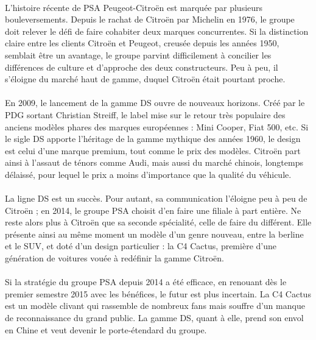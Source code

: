 \documentclass[12pt]{article}\usepackage[]{graphicx}\usepackage[]{color}
\begin{document}
\paragraph{} L'histoire récente de PSA Peugeot-Citroën est marquée par
plusieurs bouleversements. Depuis le rachat de Citroën par Michelin en 1976, le
groupe doit relever le défi de faire cohabiter deux marques concurrentes. Si la
distinction claire entre les clients Citroën et Peugeot, creusée depuis les
années 1950, semblait être un avantage, le groupe parvint difficilement à
concilier les différences de culture et d'approche des deux constructeurs. Peu
à peu, il s'éloigne du marché haut de gamme, duquel Citroën était pourtant
proche.

\paragraph{} En 2009, le lancement de la gamme DS ouvre de nouveaux horizons.
Créé par le PDG sortant Christian Streiff, le label mise sur le retour très
populaire des anciens modèles phares des marques européennes : Mini Cooper,
Fiat 500, etc. Si le sigle DS apporte l'héritage de la gamme mythique des
années 1960, le design est celui d'une marque premium, tout comme le prix des
modèles. Citroën part ainsi à l'assaut de ténors comme Audi, mais aussi du
marché chinois, longtemps délaissé, pour lequel le prix a moins d'importance
que la qualité du véhicule.

\paragraph{} La ligne DS est un succès. Pour autant, sa communication l'éloigne
peu à peu de Citroën ; en 2014, le groupe PSA choisit d'en faire une filiale à part
entière. Ne reste alors plus à Citroën que sa seconde spécialité, celle de
faire du différent. Elle présente ainsi au même moment un modèle d'un genre
nouveau, entre la berline et le SUV, et doté d'un design particulier : la C4
Cactus, première d'une génération de voitures vouée à redéfinir la gamme
Citroën.

\paragraph{} Si la stratégie du groupe PSA depuis 2014 a été efficace, en
renouant dès le premier semestre 2015 avec les bénéfices\cite{lesechos}, le
futur est plus incertain. La C4 Cactus est un modèle clivant qui rassemble de
nombreux fans mais souffre d'un manque de reconnaissance du grand public. La
gamme DS, quant à elle, prend son envol en Chine et veut devenir le porte-étendard
du groupe.\\
\end{document}
